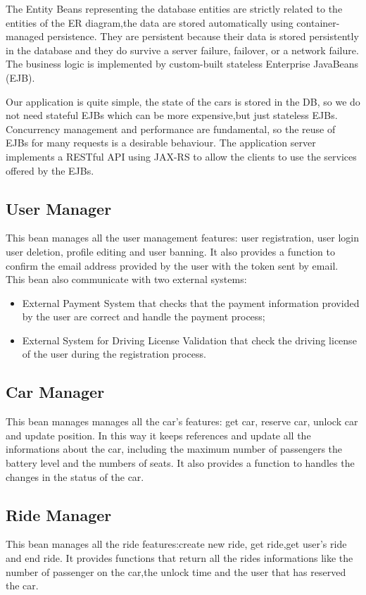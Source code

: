 The Entity Beans representing the database entities are strictly related to the entities of the ER diagram,the data  are stored automatically using container-managed persistence.
They are persistent because their data is stored persistently in the database and they do survive a server failure, failover, or a network failure.
The business logic is implemented by custom-built stateless Enterprise JavaBeans (EJB).

Our application is quite simple, the state of the cars is stored in the DB, so we do not need stateful EJBs which can be more expensive,but just stateless EJBs.
Concurrency management and performance are fundamental, so the reuse of EJBs for many requests is a desirable behaviour.
The application server implements a RESTful API using JAX-RS to allow the clients to use the services offered by the EJBs.



\subsection{User Manager}
This bean manages all the user management features: user registration, user login user deletion, profile editing and user banning.
It also provides a function to confirm the email address provided by the user with the token sent by email.
This bean also communicate with two external systems:
\begin{itemize}
\item External Payment System that checks that the payment information provided by the user are correct and handle the payment process;
\item External System for Driving License Validation that check the driving license of the user during the registration process.
\end{itemize}

\subsection{Car Manager}
This bean manages manages all the car's features: get car, reserve car, unlock car and update position.
In this way it keeps references and update all the informations about the car, including the maximum number of passengers the battery level and the numbers of seats.
It also provides a function to handles the changes in the status of the car.

\subsection{Ride Manager}
This bean manages all the ride features:create new ride, get ride,get user's ride and end ride.
It provides functions that return all the rides informations like the number of passenger on the car,the unlock time and the user that has reserved the car.


